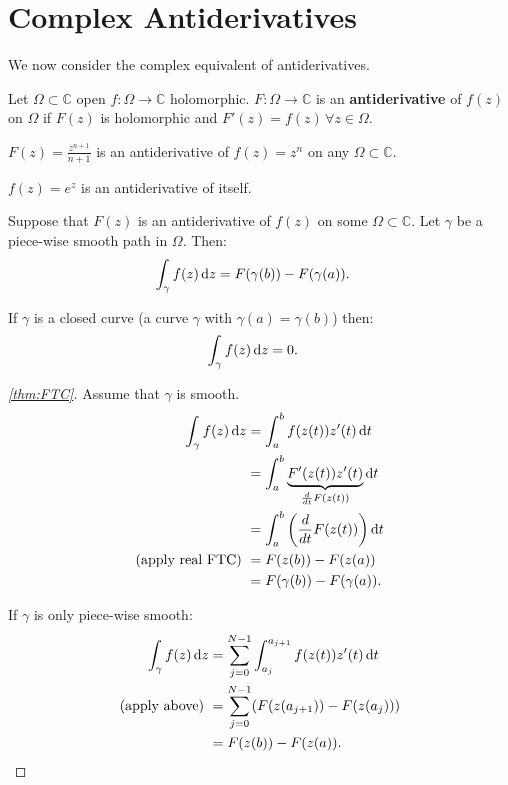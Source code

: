 \section{Complex Antiderivatives}

We now consider the complex equivalent of antiderivatives.

\begin{definition}[Antiderivatives]
Let $\Omega \subset \mathbb{C}$ open $f:\Omega \rightarrow \mathbb{C}$ holomorphic. $F:\Omega \rightarrow \mathbb{C}$ is an \textbf{antiderivative} of $f(z)$ on $\Omega$ if $F(z)$ is holomorphic and $F'(z) = f(z) \, \forall z\in\Omega $.
\end{definition}

\begin{example}
$F(z) = \frac{z^{n+1}}{n+1}$ is an antiderivative of $f(z) = z^n$ on any $\Omega \subset \mathbb{C}$.
\end{example}
\begin{example}
$f(z) = e^z$ is an antiderivative of itself.
\end{example}

\begin{theorem}
Suppose that $F(z)$ is an antiderivative of $f(z)$ on some $\Omega \subset \mathbb{C}$. Let $\gamma$ be a piece-wise smooth path in $\Omega$. Then:
\begin{align*}
    \int_\gamma f(z)  \dif z &= F(\gamma(b)) - F(\gamma(a)).
\end{align*}
\end{theorem}


\begin{corollary}
If $\gamma$ is a closed curve (a curve $\gamma$ with $\gamma(a)=\gamma(b)$) then:
\begin{align*}
    \int_\gamma f(z)  \dif z &= 0.
\end{align*}

\end{corollary}

\begin{proof}[\ref{thm:FTC}]
Assume that $\gamma$ is smooth.
\begin{align*}
    \int_\gamma f(z)  \dif z &= \int_a^b f(z(t)) z'(t)  \dif t\\
    &= \int_a^b \underbrace{F'(z(t)) z'(t)}_{\frac{d}{  dt} F(z(t))}  \dif t\\
    &= \int_a^b \left( \frac{d}{ dt} F(z(t)) \right)  \dif t\\
    \text{(apply real FTC) }&= F(z(b))-F(z(a))\\
    &= F(\gamma(b)) - F(\gamma(a)).
\end{align*}

If $\gamma$ is only piece-wise smooth:
\begin{align*}
    \int_\gamma f(z) \dif z &= \sum_{j=0}^{N-1} \int_ {a_j}^{a_{j+1}} f(z(t))z'(t) \dif t\\
   \text{(apply above) } &= \sum_{j=0}^{N-1} (F(z(a_{j+1}))-F(z(a_j)))\\
   &= F(z(b)) - F(z(a)).
\end{align*}
\end{proof}


